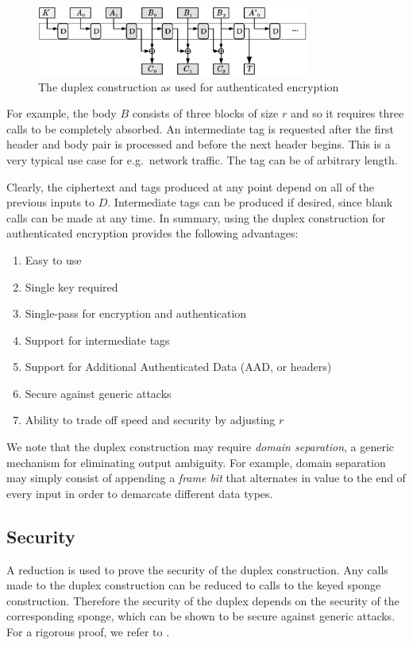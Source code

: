 \begin{figure}[ht]
\centering
\includegraphics[width=0.8\textwidth]{img/DuplexAE_Expanded-BW.png}
\caption{The duplex construction as used for authenticated encryption \cite{Bertoni2010_DuplexingSlides}}
\label{fig:DuplexAE_Expanded}
\end{figure}

For example, the body $B$ consists of three blocks of size $r$ and so it requires three calls to be completely absorbed.
An intermediate tag is requested after the first header and body pair is processed and before the next header begins.
This is a very typical use case for e.g.\ network traffic.
The tag can be of arbitrary length.

Clearly, the ciphertext and tags produced at any point depend on all of the previous inputs to $D$.
Intermediate tags can be produced if desired, since blank calls can be made at any time.
In summary, using the duplex construction for authenticated encryption provides the following advantages:
\begin{enumerate}
\item Easy to use
\item Single key required
\item Single-pass for encryption and authentication
\item Support for intermediate tags
\item Support for Additional Authenticated Data (AAD, or headers)
\item Secure against generic attacks
\item Ability to trade off speed and security by adjusting $r$
\end{enumerate}

We note that the duplex construction may require \emph{domain separation}, a generic mechanism for eliminating output ambiguity.
For example, domain separation may simply consist of appending a \emph{frame bit} that alternates in value to the end of every input in order to demarcate different data types.

\subsection{Security}
\label{sec:DuplexSecurity}
A reduction is used to prove the security of the duplex construction.
Any calls made to the duplex construction can be reduced to calls to the keyed sponge construction.
Therefore the security of the duplex depends on the security of the corresponding sponge, which can be shown to be secure against generic attacks.
For a rigorous proof, we refer to \cite{Bertoni2012_Duplexing}.

